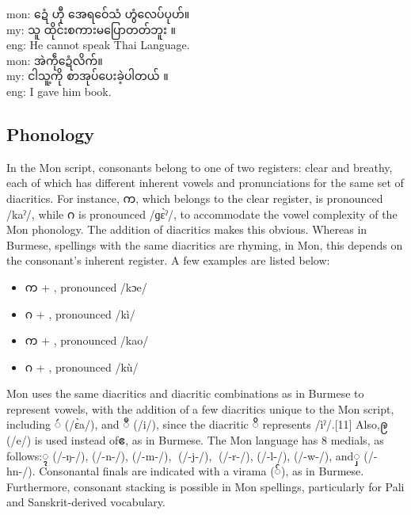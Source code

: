 \documentclass[conference]{IEEEtran}
\begin{document}
\noindent mon: {\padauktext ဍေံ ဟီု အေရဝ်ေသံ ဟွံလေပ်ပုဟ်။}\\
my:  {\padauktext သူ ထိုင်းစကားမပြောတတ်ဘူး ။}\\
eng: He cannot speak Thai Language. \\

\noindent mon: {\padauktext အဲကဵုဍေံလိက်။}\\
my:  {\padauktext ငါသူ့ကို စာအုပ်ပေးခဲ့ပါတယ် ။}\\
eng: I gave him book. \\

\subsection{Phonology}
In the Mon script, consonants belong to one of two registers: clear and breathy, each of which has different inherent vowels and pronunciations for the same set of diacritics. For instance, {\padauktext က}, which belongs to the clear register, is pronounced /kaˀ/, while {\padauktext ဂ} is pronounced /ɡɛ̀ˀ/, to accommodate the vowel complexity of the Mon phonology. The addition of diacritics makes this obvious. Whereas in Burmese, spellings with the same diacritics are rhyming, in Mon, this depends on the consonant's inherent register. A few examples are listed below:\cite{b7}
\begin{itemize}
\item {\padauktext က} +{\padauktext ီ}  , pronounced /kɔe/
\item {\padauktext ဂ} +{\padauktext ီ}  , pronounced /kì/
\item {\padauktext က} +{\padauktext ူ}  , pronounced /kao/
\item {\padauktext ဂ} +{\padauktext ူ}  , pronounced /kù/
\end{itemize}

Mon uses the same diacritics and diacritic combinations as in Burmese to represent vowels, with the addition of a few diacritics unique to the Mon script, including {\padauktext ဴ }(/ɛ̀a/), and {\padauktext ဳ }(/i/), since the diacritic {\padauktext ိ }represents /ìˀ/.[11] Also,{\padauktext ဨ }(/e/) is used instead of{\padauktext ဧ}, as in Burmese. The Mon language has 8 medials, as follows:{\padauktext ္ၚ} (/-ŋ-/),{\padauktext ၞ} (/-n-/),{\padauktext ၟ }(/-m-/),{\padauktext ျ }(/-j-/),{\padauktext ြ} (/-r-/),{\padauktext ၠ} (/-l-/),{\padauktext ွ} (/-w-/), and{\padauktext ှ} (/-hn-/). Consonantal finals are indicated with a virama {\padauktext(်)}, as in Burmese. Furthermore, consonant stacking is possible in Mon spellings, particularly for Pali and Sanskrit-derived vocabulary.\cite{b6}
\end{document}
